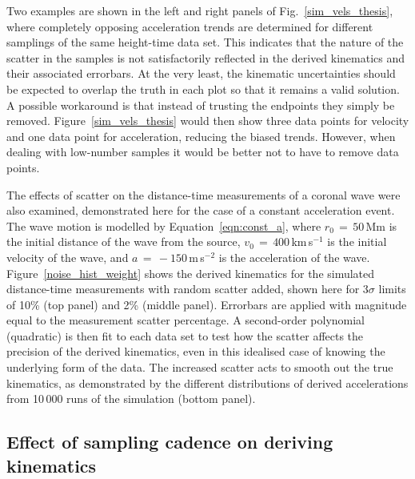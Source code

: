 \documentclass[structabstract]{aa}
\begin{document}
 
Two examples are shown in the left and right panels of Fig.~\ref{sim_vels_thesis}, where completely opposing acceleration trends are determined for different samplings of the same height-time data set. This indicates that the nature of the scatter in the samples is not satisfactorily reflected in the derived kinematics and their associated errorbars. At the very least, the kinematic uncertainties should be expected to overlap the truth in each plot so that it remains a valid solution. A possible workaround is that instead of trusting the endpoints they simply be removed. Figure~\ref{sim_vels_thesis} would then show three data points for velocity and one data point for acceleration, reducing the biased trends. However, when dealing with low-number samples it would be better not to have to remove data points.


The effects of scatter on the distance-time measurements of a coronal wave were also examined, demonstrated here for the case of a constant acceleration event. The wave motion is modelled by Equation~\ref{eqn:const_a}, where $r_0\,=\,50$\,Mm is the initial distance of the wave from the source, $v_0\,=\,400$\,km\,s$^{-1}$ is the initial velocity of the wave, and $a\,=\,-150$\,m\,s$^{-2}$ is the acceleration of the wave. Figure~\ref{noise_hist_weight} shows the derived kinematics for the simulated distance-time measurements with random scatter added, shown here for 3$\sigma$ limits of 10\% (top panel) and 2\% (middle panel). Errorbars are applied with magnitude equal to the measurement scatter percentage. A second-order polynomial (quadratic) is then fit to each data set to test how the scatter affects the precision of the derived kinematics, even in this idealised case of knowing the underlying form of the data. The increased scatter acts to smooth out the true kinematics, as demonstrated by the different distributions of derived accelerations from 10\,000 runs of the simulation (bottom panel).




\subsection{Effect of sampling cadence on deriving kinematics}
\label{subsect:cadence}
\end{document}
